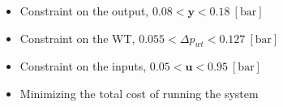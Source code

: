 \begin{itemize}
	\item Constraint on the output, $0.08 < \bm{y} < 0.18 \:[\text{bar}]$
%
	\item Constraint on the WT, $0.055 < \Delta p_{wt} < 0.127  \:[\text{bar}]$
%
	\item Constraint on the inputs, $ 0.05 < \bm{u} < 0.95  \:[\text{bar}]$
%
	\item Minimizing the total cost of running the system
\end{itemize}
 